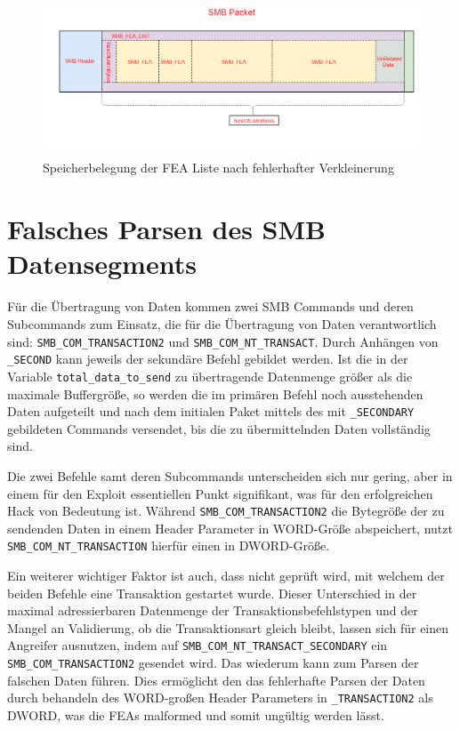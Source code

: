 \documentclass[DIV=12,headings=normal,pdftex,headinclude=false,footinclude=false,final]{scrreprt}
\begin{document}
\begin{figure}[H]
    \centering
    \includegraphics[width=15cm]{checkpoint_after_shrink_error.png}
    \caption[FEAList nach fehlerhafter Verkleinerung, Nadav Grossmann (Checkpoint Research). URL: <https://research.checkpoint.com/wp-content/uploads/2017/09/eternalblue6.png>]{Speicherbelegung der FEA Liste nach fehlerhafter Verkleinerung}
    \label{img:fealist_after_shrinking_incorrectly}
\end{figure}

\section{Falsches Parsen des SMB Datensegments}
Für die Übertragung von Daten kommen zwei SMB Commands und deren Subcommands zum Einsatz, die für die Übertragung von Daten verantwortlich sind: \verb|SMB_COM_TRANSACTION2| und \verb|SMB_COM_NT_TRANSACT|. Durch Anhängen von \verb|_SECOND| kann jeweils der sekundäre Befehl gebildet werden. Ist die in der Variable \verb|total_data_to_send| zu übertragende Datenmenge größer als die maximale Buffergröße, so werden die im primären Befehl noch ausstehenden Daten aufgeteilt und nach dem initialen Paket mittels des mit \verb|_SECONDARY|  gebildeten Commands versendet, bis die zu übermittelnden Daten vollständig sind.

\noindent
Die zwei Befehle samt deren Subcommands unterscheiden sich nur gering, aber in einem für den Exploit essentiellen Punkt signifikant, was für den erfolgreichen Hack von Bedeutung ist. Während \verb|SMB_COM_TRANSACTION2| die Bytegröße der zu sendenden Daten in einem Header Parameter in WORD-Größe abspeichert, nutzt \verb|SMB_COM_NT_TRANSACTION| hierfür einen in DWORD-Größe.

\noindent
Ein weiterer wichtiger Faktor ist auch, dass nicht geprüft wird, mit welchem der beiden Befehle eine Transaktion gestartet wurde. Dieser Unterschied in der maximal adressierbaren Datenmenge der Transaktionsbefehlstypen und der Mangel an Validierung, ob die Transaktionsart gleich bleibt, lassen sich für einen Angreifer ausnutzen, indem auf \verb|SMB_COM_NT_TRANSACT_SECONDARY| ein \verb|SMB_COM_TRANSACTION2| gesendet wird. Das wiederum kann zum Parsen der falschen Daten führen. Dies ermöglicht den das fehlerhafte Parsen der Daten durch behandeln des WORD-großen Header Parameters in \verb|_TRANSACTION2| als DWORD, was die FEAs malformed und somit ungültig werden lässt.
\end{document}
